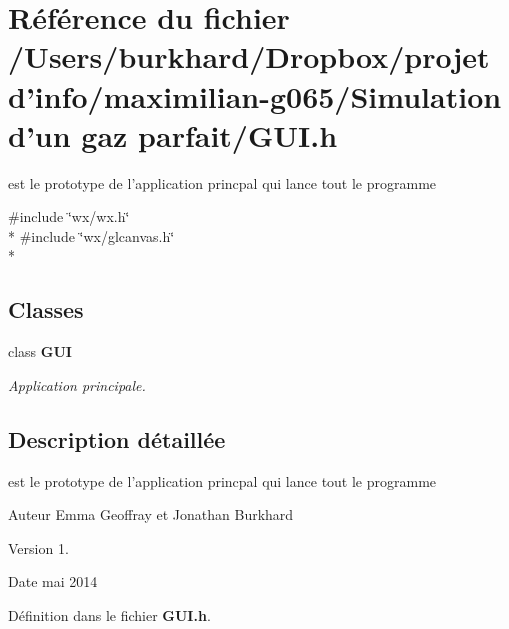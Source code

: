 \section{Référence du fichier /\+Users/burkhard/\+Dropbox/projet d'info/maximilian-\/g065/\+Simulation d'un gaz parfait/\+G\+U\+I.h}
\label{_g_u_i_8h}


est le prototype de l'application princpal qui lance tout le programme  


{\ttfamily \#include \char`\"{}wx/wx.\+h\char`\"{}}\\*
{\ttfamily \#include \char`\"{}wx/glcanvas.\+h\char`\"{}}\\*
\subsection*{Classes}
\begin{DoxyCompactItemize}
\item 
class {\bf G\+U\+I}
\begin{DoxyCompactList}\small\item\em Application principale. \end{DoxyCompactList}\end{DoxyCompactItemize}


\subsection{Description détaillée}
est le prototype de l'application princpal qui lance tout le programme 

\begin{DoxyAuthor}{Auteur}
Emma Geoffray et Jonathan Burkhard 
\end{DoxyAuthor}
\begin{DoxyVersion}{Version}
1. 
\end{DoxyVersion}
\begin{DoxyDate}{Date}
mai 2014 
\end{DoxyDate}


Définition dans le fichier {\bf G\+U\+I.\+h}.

